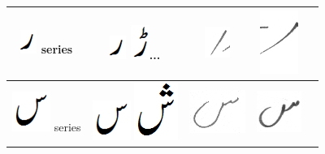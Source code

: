 \documentclass[a4paper,conference]{IEEEtran}
\begin{document}
\begin{table}[h]
\begin{tabular}{@{}ccccc@{}}
\includegraphics[scale=0.25]{re_orig} series & \includegraphics[scale=0.25]{re_orig} \includegraphics[scale=0.25]{R'e}... & \includegraphics[scale=0.20]{11} &
\includegraphics[scale=0.15]{12} &  \\ 
\hline
\includegraphics[scale=0.25]{seen_orig} series & \includegraphics[scale=0.25]{seen_orig} \includegraphics[scale=0.25]{sheen} & \includegraphics[scale=0.25]{13} &
\includegraphics[scale=0.25]{14} & \\ 
\hline

\end{tabular}
\end{table}
\end{document}
